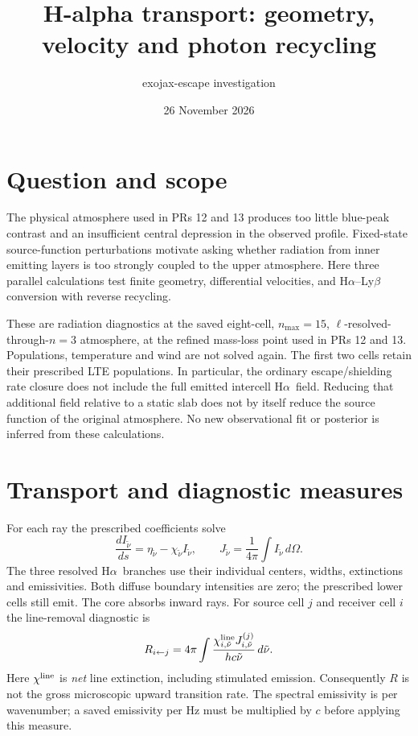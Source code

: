 \documentclass[11pt]{article}
\title{H-alpha transport: geometry, velocity and photon recycling}
\author{exojax-escape investigation}
\date{26 November 2026}
\newcommand{\Ha}{H$\alpha$}
\begin{document}
\maketitle
\section{Question and scope}
The physical atmosphere used in PRs 12 and 13 produces too little blue-peak
contrast and an insufficient central depression in the observed profile.
Fixed-state source-function perturbations motivate asking whether radiation
from inner emitting layers is too strongly coupled to the upper atmosphere.
Here three parallel calculations test finite geometry, differential velocities,
and H$\alpha$--Ly$\beta$ conversion with reverse recycling.

These are radiation diagnostics at the saved eight-cell, $n_{\max}=15$,
$\ell$-resolved-through-$n=3$ atmosphere, at the refined mass-loss point
used in PRs 12 and 13. Populations, temperature and wind are not solved again.
The first two cells retain their prescribed LTE populations. In particular,
the ordinary escape/shielding rate closure does not include the full emitted
intercell \Ha\ field. Reducing that additional field relative to a static slab
does not by itself reduce the source function of the original atmosphere.
No new observational fit or posterior is inferred from these calculations.

\section{Transport and diagnostic measures}
For each ray the prescribed coefficients solve
\begin{equation}
 \frac{dI_{\tilde\nu}}{ds}=\eta_{\tilde\nu}-\chi_{\tilde\nu}I_{\tilde\nu},
 \qquad J_{\tilde\nu}=\frac{1}{4\pi}\int I_{\tilde\nu}\,d\Omega .
\end{equation}
The three resolved \Ha\ branches use their individual centers, widths,
extinctions and emissivities. Both diffuse boundary intensities are zero;
the prescribed lower cells still emit. The core absorbs inward rays.
For source cell $j$ and receiver cell $i$ the line-removal diagnostic is
\begin{equation}
 R_{i\leftarrow j}=4\pi\int
 \frac{\chi^{\rm line}_{i,\tilde\nu}
 J^{(j)}_{i,\tilde\nu}}{hc\tilde\nu}\,d\tilde\nu .
 \label{eq:removal}
\end{equation}
Here $\chi^{\rm line}$ is \emph{net} line extinction, including stimulated
emission. Consequently $R$ is not the gross microscopic upward transition
rate. The spectral emissivity is per wavenumber; a saved emissivity per Hz
must be multiplied by $c$ before applying this measure.
\end{document}
